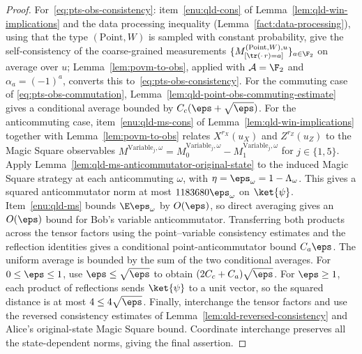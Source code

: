 \begin{proof}
	\leanok
	For~\eqref{eq:pts-obs-consistency}: item~\ref{enu:qld-cons} of
	Lemma~\ref{lem:qld-win-implications} and the data processing inequality
	(Lemma~\ref{fact:data-processing}), using that the type
	$(\mathrm{Point},W)$ is sampled with constant probability, give the
	self-consistency of the coarse-grained measurements
	$\{M^{(\mathrm{Point},W),u}_{[\tr(\cdot\,r)=a]}\}_{a \in \F_2}$ on
	average over $u$; Lemma~\ref{lem:povm-to-obs}, applied with
	$\mathcal{A} = \F_2$ and $\alpha_a = (-1)^a$, converts this
	to~\eqref{eq:pts-obs-consistency}. For the commuting case of
	\eqref{eq:pts-obs-commutation},
	Lemma~\ref{lem:qld-point-obs-commuting-estimate} gives a conditional
	average bounded by $C_c(\eps+\sqrt\eps)$.
	For the anticommuting case, item~\ref{enu:qld-ms-cons} of
	Lemma~\ref{lem:qld-win-implications} together with
	Lemma~\ref{lem:povm-to-obs} relates $X^{r_X}(u_X)$ and $Z^{r_Z}(u_Z)$
	to the Magic Square observables
	$M^{\mathrm{Variable}_j,\omega} = M^{\mathrm{Variable}_j,\omega}_0 - M^{\mathrm{Variable}_j,\omega}_1$
	for $j \in \{1,5\}$. Apply
	Lemma~\ref{lem:qld-ms-anticommutator-original-state} to the induced
	Magic Square strategy at each anticommuting $\omega$, with
	$\eta=\eps_\omega=1-\Lambda_\omega$. This gives a squared
	anticommutator norm at most $1183680\eps_\omega$ on $\ket{\psi}$.
	Item~\ref{enu:qld-ms} bounds $\E\eps_\omega$ by $O(\eps)$, so
	direct averaging gives an $O(\eps)$ bound for Bob's variable
	anticommutator. Transferring both products across the tensor factors
	using the point--variable consistency estimates and the reflection
	identities gives a conditional point-anticommutator bound $C_a\eps$.
	The uniform average is bounded by the sum of the two conditional
	averages. For $0\leq\eps\leq1$, use $\eps\leq\sqrt\eps$ to
	obtain $(2C_c+C_a)\sqrt\eps$. For $\eps\geq1$, each product of
	reflections sends $\ket{\psi}$ to a unit vector, so the squared
	distance is at most $4\leq4\sqrt\eps$.
	Finally, interchange the tensor factors and use the reversed
	consistency estimates of Lemma~\ref{lem:qld-reversed-consistency}
	and Alice's original-state Magic Square bound. Coordinate interchange
	preserves all the state-dependent norms, giving the final assertion.
\end{proof}


